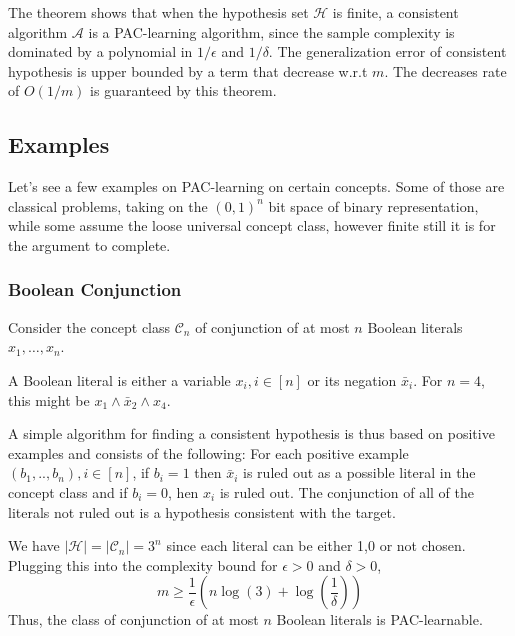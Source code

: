 The theorem shows that when the hypothesis set $\mathcal{H}$ is finite, a consistent algorithm $\mathcal{A}$ is a PAC-learning algorithm, since the sample complexity is dominated by a polynomial in $1/\epsilon$ and $1/\delta$. The generalization error of consistent hypothesis is upper bounded by a term that decrease w.r.t $m$. The decreases rate of $O(1/m)$ is guaranteed by this theorem. 

\subsection{Examples}
Let's see a few examples on PAC-learning on certain concepts. Some of those are classical problems, taking on the $(0,1)^{n}$ bit space of binary representation, while some assume the loose universal concept class, however finite still it is for the argument to complete. 
\subsubsection{Boolean Conjunction}
Consider the concept class $\mathcal{C}_{n}$ of conjunction of at most $n$ Boolean literals $x_{1},\dots,x_{n}$. 

A Boolean literal is either a variable $x_{i}, i\in [n]$ or its negation $\bar{x}_{i}$. For $n=4$, this might be $x_{1}\land  \bar{x}_{2}\land x_{4}$. 

A simple algorithm for finding a consistent hypothesis is thus based on positive examples and consists of the following: For each positive example $(b_{1},..,b_{n}),i\in [n]$, if $b_{i}=1$ then $\bar{x}_{i}$ is ruled out as a possible literal in the concept class and if $b_{i}=0$, hen $x_{i}$ is ruled out. The conjunction of all of the literals not ruled out is a hypothesis consistent with the target. 

We have $\lvert \mathcal{H} \rvert=\lvert \mathcal{C}_{n} \rvert=3^{n}$ since each literal can be either 1,0 or not chosen. Plugging this into the complexity bound for $\epsilon>0$ and $\delta>0$, \begin{equation}
    m\geq \frac{1}{\epsilon}\left( n\log{(3)+\log{\left( \frac{1}{\delta} \right)}} \right)
\end{equation}
Thus, the class of conjunction of at most $n$ Boolean literals is PAC-learnable. 

